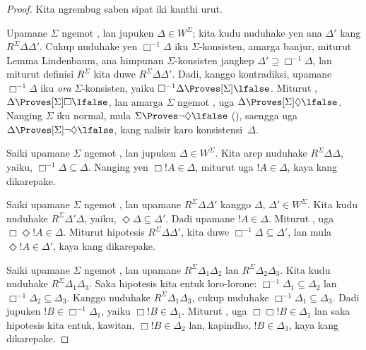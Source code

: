 \documentclass[../../../include/open-logic-section]{subfiles}
\begin{document}
\begin{proof}
  Kita ngrembug saben sipat iki kanthi urut.

  Upamane $\Sigma$ ngemot , lan jupuken $\Delta \in W^\Sigma$;
  kita kudu nuduhake yen ana $\Delta'$ kang $R^\Sigma
  \Delta\Delta'$. Cukup nuduhake yen $\Box^{-1}\Delta$ iku
  $\Sigma$-konsisten, amarga banjur, miturut Lemma Lindenbaum, ana
  himpunan $\Sigma$-konsisten jangkep $\Delta' \supseteq
  \Box^{-1}\Delta$, lan miturut definisi $R^\Sigma$
  kita duwe
  $R^\Sigma \Delta\Delta'$. Dadi, kanggo kontradiksi, upamane
  $\Box^{-1}\Delta$ iku \emph{ora} $\Sigma$-konsisten, yaiku
  $\Box^{-1}\Delta \Proves[\Sigma] \lfalse$. Miturut ,
  $\Delta \Proves[\Sigma] \Box\lfalse$, lan amarga $\Sigma$ ngemot
  , uga $\Delta \Proves[\Sigma] \Diamond\lfalse$. Nanging $\Sigma$
  iku normal, mula $\Sigma \Proves \lnot\Diamond \lfalse$
  (), saengga uga $\Delta
  \Proves[\Sigma] \lnot\Diamond \lfalse$, kang nalisir karo
  konsistensi~$\Delta$.

  Saiki upamane $\Sigma$ ngemot , lan jupuken $\Delta \in
  W^\Sigma$. Kita arep nuduhake $R^\Sigma \Delta\Delta$,
  yaiku,
  $\Box^{-1}\Delta \subseteq \Delta$. Nanging yen $\Box!A \in \Delta$,
  miturut  uga $!A \in \Delta$, kaya kang dikarepake.

  Saiki upamane $\Sigma$ ngemot , lan upamane $R^\Sigma
  \Delta\Delta'$ kanggo $\Delta$, $\Delta' \in W^\Sigma$. Kita kudu
  nuduhake $R^\Sigma \Delta'\Delta$, yaiku,
  $\Diamond\Delta \subseteq \Delta'$. Dadi upamane $!A \in \Delta$.
  Miturut , uga $\Box\Diamond!A \in \Delta$. Miturut hipotesis
  $R^\Sigma \Delta\Delta'$, kita duwe $\Box^{-1}\Delta
  \subseteq \Delta'$, lan mula $\Diamond!A \in \Delta'$, kaya kang
  dikarepake.

  Saiki upamane $\Sigma$ ngemot , lan upamane $R^\Sigma
  \Delta_1\Delta_2$ lan $R^\Sigma \Delta_2\Delta_3$. Kita kudu nuduhake
  $R^\Sigma \Delta_1\Delta_3$. Saka hipotesis kita entuk loro-lorone:
  $\Box^{-1}\Delta_1 \subseteq \Delta_2$ lan $\Box^{-1}\Delta_2
  \subseteq \Delta_3$. Kanggo nuduhake $R^\Sigma \Delta_1\Delta_3$,
  cukup nuduhake $\Box^{-1}\Delta_1 \subseteq \Delta_3$. Dadi jupuken
  $!B \in \Box^{-1}\Delta_1$, yaiku $\Box!B \in \Delta_1$. Miturut
  , uga $\Box\Box!B \in \Delta_1$ lan saka hipotesis kita entuk,
  kawitan, $\Box!B \in \Delta_2$ lan, kapindho, $!B \in \Delta_3$,
  kaya kang dikarepake.


\end{proof}
\end{document}

